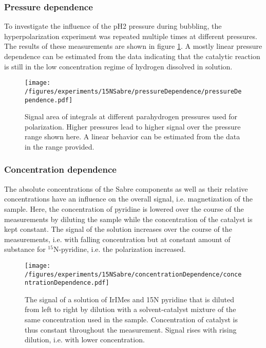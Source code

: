     \subsubsection{Pressure dependence}
    To investigate the influence of the pH2 pressure during bubbling, the hyperpolarization experiment was repeated multiple times at different pressures. The results of these measurements are shown in figure \ref{fig:results:15N:pressureDependence}. A mostly linear pressure dependence can be estimated from the data indicating that the catalytic reaction is still in the low concentration regime of hydrogen dissolved in solution.
        \begin{figure}
            \texttt{[image: /figures/experiments/15NSabre/pressureDependence/pressureDependence.pdf]}
            \caption[Pressure dependence]{Signal area of integrals at different parahydrogen pressures used for polarization. Higher pressures lead to higher signal over the pressure range shown here. A linear behavior can be estimated from the data in the range provided.}
            \label{fig:results:15N:pressureDependence}
        \end{figure}
    \subsubsection{Concentration dependence}
        The absolute concentrations of the Sabre components as well as their relative concentrations have an influence on the overall signal, i.e. magnetization of the sample. Here, the concentration of pyridine is lowered over the course of the measurements by diluting the sample while the concentration of the catalyst is kept constant. The signal of the solution increases over the course of the measurements, i.e. with falling concentration but at constant amount of substance for $^{15}$N-pyridine, i.e. the polarization increased.
        \begin{figure}
            \texttt{[image: /figures/experiments/15NSabre/concentrationDependence/concentrationDependence.pdf]}
            \caption[Concentration dependence]{The signal of a solution of IrIMes and 15N pyridine that is diluted from left to right by dilution with a solvent-catalyst mixture of the same concentration used in the sample. Concentration of catalyst is thus constant throughout the measurement. Signal rises with rising dilution, i.e. with lower concentration.}
            \label{fig:results:15N:concentrationDependence}
        \end{figure}
